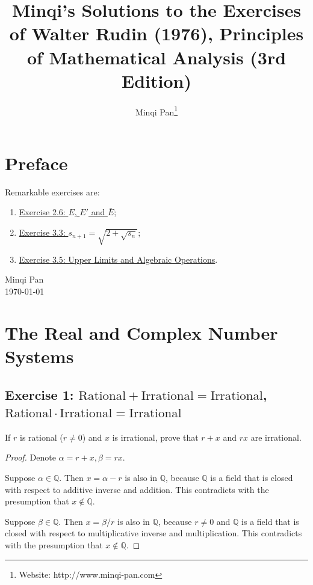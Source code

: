 \documentclass{amsbook}
\theoremstyle{definition}
\theoremstyle{remark}
\numberwithin{section}{chapter}
\numberwithin{equation}{chapter}
\begin{document}
\frontmatter

\title{Minqi's Solutions to the Exercises of Walter Rudin (1976), Principles of Mathematical Analysis (3rd Edition)}

\author{Minqi Pan\footnote{Website: http://www.minqi-pan.com}}

\maketitle

\setcounter{page}{4}

\tableofcontents

\chapter*{Preface}

Remarkable exercises are:
\begin{enumerate}
\item\hyperref[Exercise 2.6]{Exercise 2.6: $E$, $E'$ and $\bar E$};
\item\hyperref[Exercise 3.3]{Exercise 3.3: $s_{n+1}=\sqrt{2+\sqrt{s_n}}$};
\item\hyperref[Exercise 3.5]{Exercise 3.5: Upper Limits and Algebraic Operations}.
\end{enumerate}

\medskip
\begin{flushright}
Minqi Pan\\
\today
\end{flushright}

\mainmatter

\chapter{The Real and Complex Number Systems}

\section{Exercise 1: $\text{Rational}+\text{Irrational}=\text{Irrational}$, $\text{Rational}\cdot\text{Irrational}=\text{Irrational}$}

If $r$ is rational ($r\ne 0$) and $x$ is irrational, prove that $r+x$ and $rx$ are irrational.

\begin{proof}
Denote $\alpha=r+x, \beta=rx$.

Suppose $\alpha\in\mathbb{Q}$. Then $x=\alpha-r$ is also in $\mathbb{Q}$, because $\mathbb{Q}$ is a field that is closed with respect to additive inverse and addition. This contradicts with the presumption that $x\notin\mathbb{Q}$.

Suppose $\beta\in\mathbb{Q}$. Then $x=\beta/r$ is also in $\mathbb{Q}$, because $r\ne 0$ and $\mathbb{Q}$ is a field that is closed with respect to multiplicative inverse and multiplication. This contradicts with the presumption that $x\notin\mathbb{Q}$.
\end{proof}
\end{document}
